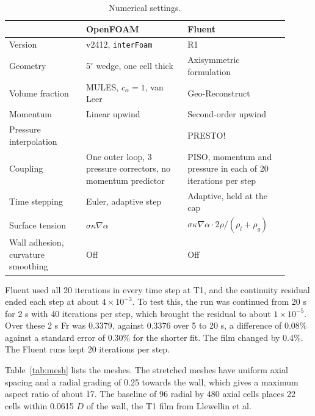\documentclass[11pt,a4paper]{article}
\begin{document}
\begin{table}[H]
\centering
\small
\caption{Numerical settings.}
\label{tab:solver}
\setlength{\tabcolsep}{3pt}
\begin{tabular}{>{\raggedright\arraybackslash}p{0.25\linewidth}>{\raggedright\arraybackslash}p{0.33\linewidth}>{\raggedright\arraybackslash}p{0.33\linewidth}}
\toprule
 & OpenFOAM & Fluent \\
\midrule
Version & v2412, \texttt{interFoam} & 2024 R1 \\
Geometry & $5^\circ$ wedge, one cell thick & Axisymmetric formulation \\
Volume fraction & MULES, $c_\alpha = 1$, van Leer & Geo-Reconstruct \\
Momentum & Linear upwind & Second-order upwind \\
Pressure interpolation & & PRESTO! \\
Coupling & One outer loop, 3 pressure correctors, no momentum predictor & PISO, momentum and pressure in each of 20 iterations per step \\
Time stepping & Euler, adaptive step & Adaptive, held at the cap \\
Surface tension & $\sigma\kappa\nabla\alpha$ & $\sigma\kappa\nabla\alpha \cdot 2\rho/(\rho_l+\rho_g)$ \\
Wall adhesion, curvature smoothing & Off & Off \\
\bottomrule
\end{tabular}
\end{table}

Fluent used all 20 iterations in every time step at T1, and the continuity residual ended each step at about $4\times10^{-3}$. To test this, the run was continued from 20 s for 2 s with 40 iterations per step, which brought the residual to about $1\times10^{-5}$. Over these 2 s Fr was 0.3379, against 0.3376 over 5 to 20 s, a difference of 0.08\% against a standard error of 0.30\% for the shorter fit. The film changed by 0.4\%. The Fluent runs kept 20 iterations per step.

Table~\ref{tab:mesh} lists the meshes. The stretched meshes have uniform axial spacing and a radial grading of 0.25 towards the wall, which gives a maximum aspect ratio of about 17. The baseline of 96 radial by 480 axial cells places 22 cells within 0.0615 $D$ of the wall, the T1 film from Llewellin et al.
\end{document}
